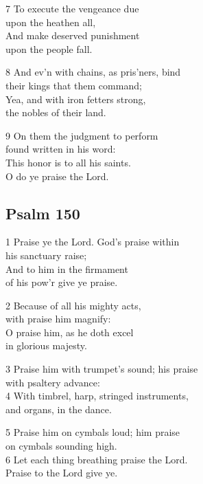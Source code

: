 7 To execute the vengeance due\\
upon the heathen all,\\
And make deserved punishment\\
upon the people fall.

8 And ev’n with chains, as pris’ners, bind\\
their kings that them command;\\
Yea, and with iron fetters strong,\\
the nobles of their land.

9 On them the judgment to perform\\
found written in his word:\\
This honor is to all his saints.\\
O do ye praise the Lord.

\begin{center}
\quad{}\quad{}
\end{center}

\subsection*{Psalm 150}

1 Praise ye the Lord. God’s praise within\\
his sanctuary raise;\\
And to him in the firmament\\
of his pow’r give ye praise.

2 Because of all his mighty acts,\\
with praise him magnify:\\
O praise him, as he doth excel\\
in glorious majesty.

3 Praise him with trumpet’s sound; his praise\\
with psaltery advance:\\
4 With timbrel, harp, stringed instruments,\\
and organs, in the dance.

5 Praise him on cymbals loud; him praise\\
on cymbals sounding high.\\
6 Let each thing breathing praise the Lord.\\
Praise to the Lord give ye.

\begin{center}
\quad{}\quad{}
\end{center}

